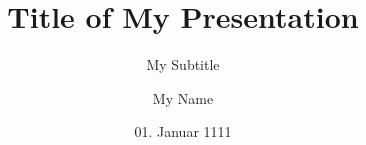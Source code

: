\documentclass{beamer}
\title{Title of My Presentation}
\subtitle{My Subtitle}
\author{My Name}
\institute{My Institute}
\date{01. Januar 1111}
\begin{document}
\frame{\titlepage}
\end{document}
